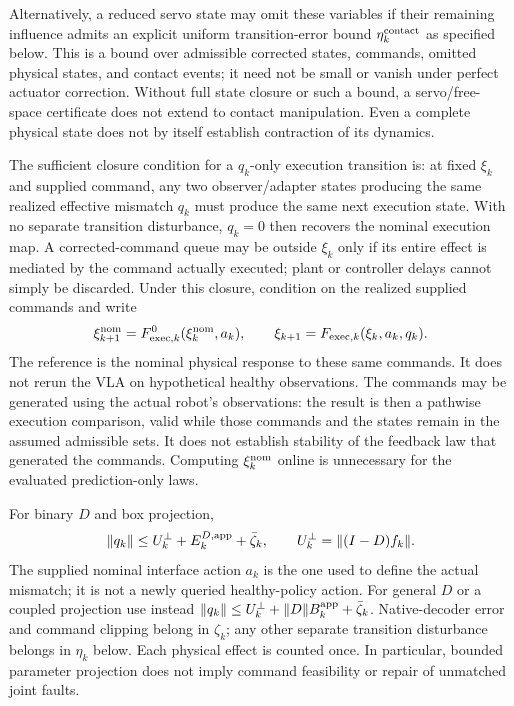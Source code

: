 Alternatively, a reduced servo state may omit these variables if their
remaining influence admits an explicit uniform transition-error bound
$\eta_k^{\rm contact}$ as specified below. This is a bound over admissible
corrected states, commands, omitted physical states, and contact events;
it need not be small or vanish under perfect actuator correction. Without
full state closure or such a bound, a servo/free-space certificate does not
extend to contact manipulation. Even a complete physical state does not
by itself establish contraction of its dynamics.

The sufficient closure condition for a $q_k$-only execution transition is:
at fixed $\xi_k$ and supplied command, any two observer/adapter states
producing the same realized effective mismatch $q_k$ must produce the same
next execution state. With no separate transition disturbance, $q_k=0$
then recovers the nominal execution map. A corrected-command queue may be
outside $\xi_k$ only if its entire effect is mediated by the command
actually executed; plant or controller delays cannot simply be discarded.
Under this closure, condition on the realized supplied commands and write
\begin{equation}
\xi_{k+1}^{\rm nom}=F_{\mathrm{exec},k}^0(\xi_{k}^{\rm nom},a_k),\qquad
\xi_{k+1}=F_{\mathrm{exec},k}(\xi_k,a_k,q_k).
\label{eq:app-closed-loop}
\end{equation}
The reference is the nominal physical response to these same commands.
It does not rerun the VLA on hypothetical healthy observations. The commands
may be generated using the actual robot's observations: the result is then
a pathwise execution comparison, valid while those commands and the states
remain in the assumed admissible sets. It does not establish stability of
the feedback law that generated the commands. Computing $\xi_{k}^{\rm nom}$ online
is unnecessary for the evaluated prediction-only laws.

For binary $D$ and box projection,
\begin{equation}
\|q_k\|\le U_k^\perp+E_k^{D,\rm app}+\bar\zeta_k,
\qquad U_k^\perp=\|(I-D)f_k\|.
\label{eq:app-mask}
\end{equation}
The supplied nominal interface action $a_k$ is the one used to define the
actual mismatch; it is not a newly queried healthy-policy action. For
general $D$ or a coupled projection use instead
$\|q_k\|\le U_k^\perp+\|D\|B_k^{\rm app}+\bar\zeta_k$.
Native-decoder error and command clipping belong in $\zeta_k$; any other
separate transition disturbance belongs in $\eta_k$ below. Each physical
effect is counted once. In particular, bounded parameter projection does
not imply command feasibility or repair of unmatched joint faults.

